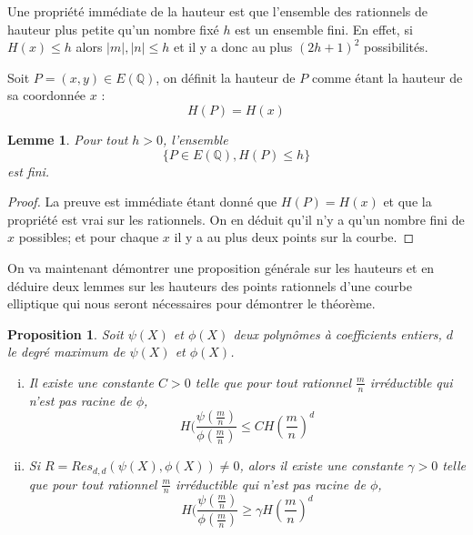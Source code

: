 \documentclass{article}
\newtheorem{proposition}{Proposition}
\newtheorem{lemme}{Lemme}
\begin{document}
Une propriété immédiate de la hauteur est que l'ensemble des rationnels de hauteur plus petite qu'un
nombre fixé $h$ est un ensemble fini. En effet, si $H(x) \leq h$ alors $|m|, |n| \leq h$ et il y a donc
au plus $(2h+1)^2$ possibilités.

Soit $P=(x,y) \in E(\mathbb{Q})$, on définit la hauteur de $P$ comme étant la hauteur de sa coordonnée $x$ :
\begin{equation*}
H(P) = H(x)
\end{equation*}

\begin{lemme}
Pour tout $h > 0$, l'ensemble
\begin{equation*}
\{P\in E(\mathbb{Q}), H(P) \leq h\}
\end{equation*}
est fini.
\end{lemme}

\begin{proof}
La preuve est immédiate étant donné que $H(P) = H(x)$ et que la propriété est vrai sur les rationnels. On en déduit qu'il n'y a qu'un nombre fini de $x$ possibles; et pour chaque $x$ il y a au plus deux points sur la courbe.
\end{proof}

On va maintenant démontrer une proposition générale sur les hauteurs et en déduire deux lemmes sur les
hauteurs des points rationnels d'une courbe elliptique qui nous seront nécessaires pour démontrer le théorème.

\begin{proposition}
\label{propH}
Soit $\psi(X)$ et $\phi(X)$ deux polynômes à coefficients entiers, $d$ le degré maximum de $\psi(X)$ et $\phi(X)$.
\begin{enumerate}[(i)]
\item Il existe une constante $C > 0$ telle que pour tout rationnel $\frac{m}{n}$ irréductible qui n'est pas racine de $\phi$,
\begin{equation*}
H(\frac{\psi(\frac{m}{n})}{\phi(\frac{m}{n})} \leq C H(\frac{m}{n})^d
\end{equation*}
\item Si $R=Res_{d,d}(\psi(X), \phi(X))\neq 0$, alors il existe une constante $\gamma > 0$ telle que pour tout rationnel
$\frac{m}{n}$ irréductible qui n'est pas racine de $\phi$,
\begin{equation*}
H(\frac{\psi(\frac{m}{n})}{\phi(\frac{m}{n})} \geq \gamma H(\frac{m}{n})^d
\end{equation*}
\end{enumerate}
\end{proposition}
\end{document}

